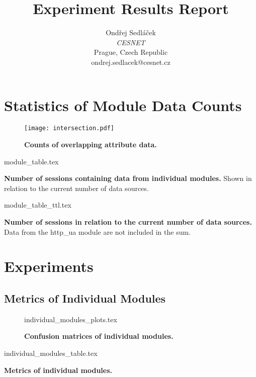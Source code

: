 \documentclass{article}
\begin{document}
\title{Experiment Results Report}
\author{Ondřej Sedláček \\
\textit{CESNET} \\
Prague, Czech Republic \\
ondrej.sedlacek@cesnet.cz}
\maketitle

\tableofcontents
\clearpage

\section{Statistics of Module Data Counts}

\begin{figure}[H]
	\centering
	\texttt{[image: intersection.pdf]}
	\caption{\textbf{Counts of overlapping attribute data.}}
\end{figure}

\begin{table}[H]
	\centering
	{module_table.tex}
	\caption{\textbf{Number of sessions containing data from individual modules.} Shown in relation to the current number of data sources.}
\end{table}

\begin{table}[H]
	\centering
	{module_table_ttl.tex}
    \caption{\textbf{Number of sessions in relation to the current number of data sources.} Data from the http\_ua module are not included in the sum.}
\end{table}


\clearpage
\section{Experiments}

\subsection{Metrics of Individual Modules}

\begin{figure}[H]
	\centering
    {individual_modules_plots.tex}
    \caption{\textbf{Confusion matrices of individual modules.} }
	\label{cm-modules}
\end{figure}

\begin{table}[H]
	\centering
	{individual_modules_table.tex}
	\caption{\textbf{Metrics of individual modules.}}
	\label{tab:metrics-modules}
\end{table}
\end{document}
